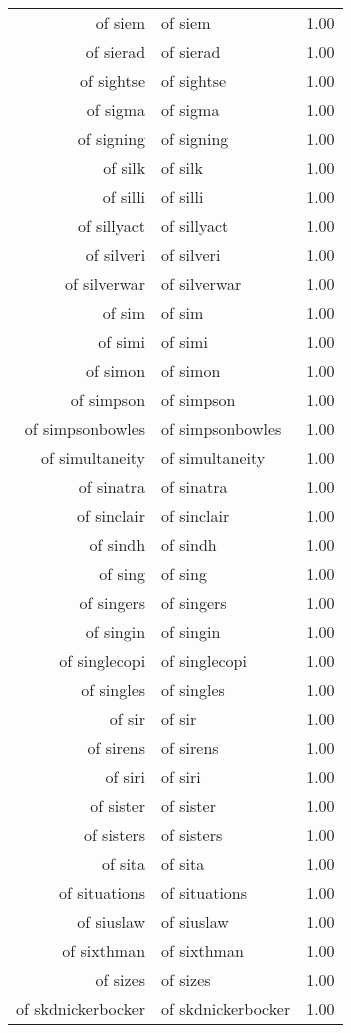 \begin{table}[ht]
\begin{tabular}{rlr}
  of siem & of siem & 1.00 \\ 
  of sierad & of sierad & 1.00 \\ 
  of sightse & of sightse & 1.00 \\ 
  of sigma & of sigma & 1.00 \\ 
  of signing & of signing & 1.00 \\ 
  of silk & of silk & 1.00 \\ 
  of silli & of silli & 1.00 \\ 
  of sillyact & of sillyact & 1.00 \\ 
  of silveri & of silveri & 1.00 \\ 
  of silverwar & of silverwar & 1.00 \\ 
  of sim & of sim & 1.00 \\ 
  of simi & of simi & 1.00 \\ 
  of simon & of simon & 1.00 \\ 
  of simpson & of simpson & 1.00 \\ 
  of simpsonbowles & of simpsonbowles & 1.00 \\ 
  of simultaneity & of simultaneity & 1.00 \\ 
  of sinatra & of sinatra & 1.00 \\ 
  of sinclair & of sinclair & 1.00 \\ 
  of sindh & of sindh & 1.00 \\ 
  of sing & of sing & 1.00 \\ 
  of singers & of singers & 1.00 \\ 
  of singin & of singin & 1.00 \\ 
  of singlecopi & of singlecopi & 1.00 \\ 
  of singles & of singles & 1.00 \\ 
  of sir & of sir & 1.00 \\ 
  of sirens & of sirens & 1.00 \\ 
  of siri & of siri & 1.00 \\ 
  of sister & of sister & 1.00 \\ 
  of sisters & of sisters & 1.00 \\ 
  of sita & of sita & 1.00 \\ 
  of situations & of situations & 1.00 \\ 
  of siuslaw & of siuslaw & 1.00 \\ 
  of sixthman & of sixthman & 1.00 \\ 
  of sizes & of sizes & 1.00 \\ 
  of skdnickerbocker & of skdnickerbocker & 1.00 \\ 

\end{tabular}
\end{table}
